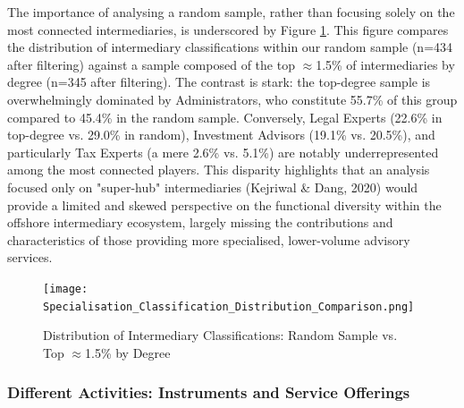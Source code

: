 The importance of analysing a random sample, rather than focusing solely on the most connected intermediaries, is underscored by Figure \ref{fig:specialisation_classification_distribution}. This figure compares the distribution of intermediary classifications within our random sample (n=434 after filtering) against a sample composed of the top $\approx$1.5\% of intermediaries by degree (n=345 after filtering). The contrast is stark: the top-degree sample is overwhelmingly dominated by Administrators, who constitute 55.7\% of this group compared to 45.4\% in the random sample. Conversely, Legal Experts (22.6\% in top-degree vs. 29.0\% in random), Investment Advisors (19.1\% vs. 20.5\%), and particularly Tax Experts (a mere 2.6\% vs. 5.1\%) are notably underrepresented among the most connected players. This disparity highlights that an analysis focused only on "super-hub" intermediaries (Kejriwal \& Dang, 2020) would provide a limited and skewed perspective on the functional diversity within the offshore intermediary ecosystem, largely missing the contributions and characteristics of those providing more specialised, lower-volume advisory services. 

\begin{figure}[htbp]
    \centering
    \texttt{[image: Specialisation\_Classification\_Distribution\_Comparison.png]}
    \caption{Distribution of Intermediary Classifications: Random Sample vs. Top $\approx$1.5\% by Degree}
    \label{fig:specialisation_classification_distribution}
\end{figure}

\subsubsection{Different Activities: Instruments and Service Offerings}
\label{subsubsec:activities_functional}

